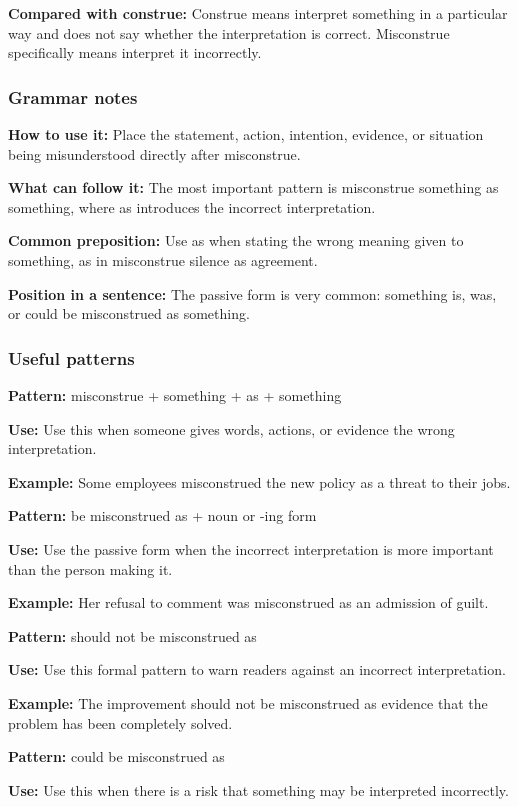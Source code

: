 \documentclass[11pt]{article}
\begin{document}
\textbf{Compared with construe:} Construe means interpret something in a particular way and does not say whether the interpretation is correct. Misconstrue specifically means interpret it incorrectly.

\subsubsection{Grammar notes}
\textbf{How to use it:} Place the statement, action, intention, evidence, or situation being misunderstood directly after misconstrue.

\textbf{What can follow it:} The most important pattern is misconstrue something as something, where as introduces the incorrect interpretation.

\textbf{Common preposition:} Use as when stating the wrong meaning given to something, as in misconstrue silence as agreement.

\textbf{Position in a sentence:} The passive form is very common: something is, was, or could be misconstrued as something.

\subsubsection{Useful patterns}
\textbf{Pattern:} misconstrue + something + as + something

\textbf{Use:} Use this when someone gives words, actions, or evidence the wrong interpretation.

\textbf{Example:} Some employees misconstrued the new policy as a threat to their jobs.

\textbf{Pattern:} be misconstrued as + noun or -ing form

\textbf{Use:} Use the passive form when the incorrect interpretation is more important than the person making it.

\textbf{Example:} Her refusal to comment was misconstrued as an admission of guilt.

\textbf{Pattern:} should not be misconstrued as

\textbf{Use:} Use this formal pattern to warn readers against an incorrect interpretation.

\textbf{Example:} The improvement should not be misconstrued as evidence that the problem has been completely solved.

\textbf{Pattern:} could be misconstrued as

\textbf{Use:} Use this when there is a risk that something may be interpreted incorrectly.
\end{document}
